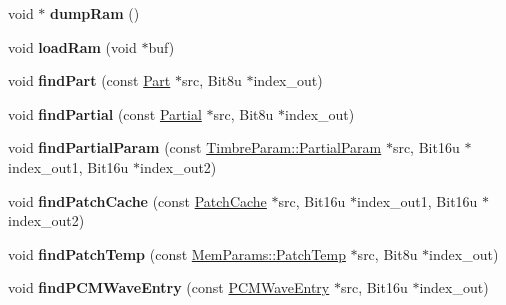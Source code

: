 \begin{DoxyCompactItemize}
\item 
\hypertarget{classMT32Emu_1_1Synth_a71b4cde1ea2e0e7c5c7803d7ccb6816c}{void $\ast$ {\bfseries dump\-Ram} ()}\label{classMT32Emu_1_1Synth_a71b4cde1ea2e0e7c5c7803d7ccb6816c}

\item 
\hypertarget{classMT32Emu_1_1Synth_a371fcf92d1ec7bb3849501c982b4b464}{void {\bfseries load\-Ram} (void $\ast$buf)}\label{classMT32Emu_1_1Synth_a371fcf92d1ec7bb3849501c982b4b464}

\item 
\hypertarget{classMT32Emu_1_1Synth_a949eeff126001f7806dee4a4fc9250e8}{void {\bfseries find\-Part} (const \hyperlink{classMT32Emu_1_1Part}{Part} $\ast$src, Bit8u $\ast$index\-\_\-out)}\label{classMT32Emu_1_1Synth_a949eeff126001f7806dee4a4fc9250e8}

\item 
\hypertarget{classMT32Emu_1_1Synth_afb46323f5cd4751c84f1a290f573ea61}{void {\bfseries find\-Partial} (const \hyperlink{classMT32Emu_1_1Partial}{Partial} $\ast$src, Bit8u $\ast$index\-\_\-out)}\label{classMT32Emu_1_1Synth_afb46323f5cd4751c84f1a290f573ea61}

\item 
\hypertarget{classMT32Emu_1_1Synth_a01faecf3e80e82ab5e275fbcd500dedd}{void {\bfseries find\-Partial\-Param} (const \hyperlink{structMT32Emu_1_1TimbreParam_1_1PartialParam}{Timbre\-Param\-::\-Partial\-Param} $\ast$src, Bit16u $\ast$index\-\_\-out1, Bit16u $\ast$index\-\_\-out2)}\label{classMT32Emu_1_1Synth_a01faecf3e80e82ab5e275fbcd500dedd}

\item 
\hypertarget{classMT32Emu_1_1Synth_ab9a5d872465d18d90ba6f065d521e350}{void {\bfseries find\-Patch\-Cache} (const \hyperlink{structMT32Emu_1_1PatchCache}{Patch\-Cache} $\ast$src, Bit16u $\ast$index\-\_\-out1, Bit16u $\ast$index\-\_\-out2)}\label{classMT32Emu_1_1Synth_ab9a5d872465d18d90ba6f065d521e350}

\item 
\hypertarget{classMT32Emu_1_1Synth_ad953978b694ddddd4a2aa159aa5c1133}{void {\bfseries find\-Patch\-Temp} (const \hyperlink{structMT32Emu_1_1MemParams_1_1PatchTemp}{Mem\-Params\-::\-Patch\-Temp} $\ast$src, Bit8u $\ast$index\-\_\-out)}\label{classMT32Emu_1_1Synth_ad953978b694ddddd4a2aa159aa5c1133}

\item 
\hypertarget{classMT32Emu_1_1Synth_a229b056682288562ec83eea9409839c3}{void {\bfseries find\-P\-C\-M\-Wave\-Entry} (const \hyperlink{structMT32Emu_1_1PCMWaveEntry}{P\-C\-M\-Wave\-Entry} $\ast$src, Bit16u $\ast$index\-\_\-out)}\label{classMT32Emu_1_1Synth_a229b056682288562ec83eea9409839c3}


\end{DoxyCompactItemize}
